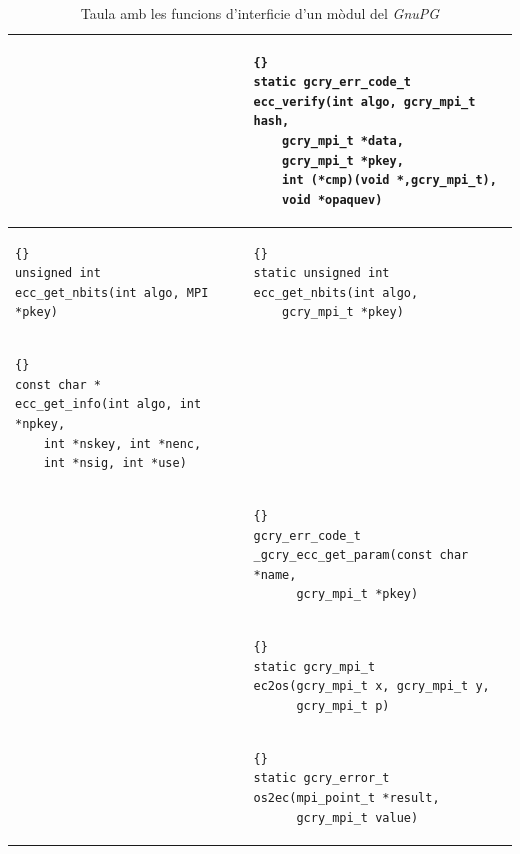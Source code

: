 \documentclass[12pt,twoside,catalan,a4paper]{book}%
\numberwithin{figure}{section}		%
\theoremstyle{definition}   			%
\theoremstyle{saltolinea}   			%
\begin{document}
\begin{table}
\begin{center}
\begin{tabular}{|l|l|}
&
{\tt \begin{lstlisting}{}
static gcry_err_code_t
ecc_verify(int algo, gcry_mpi_t hash,
    gcry_mpi_t *data,
    gcry_mpi_t *pkey,
    int (*cmp)(void *,gcry_mpi_t),
    void *opaquev)
\end{lstlisting} }
\\
\hline
{\tt \begin{lstlisting}{}
unsigned int
ecc_get_nbits(int algo, MPI *pkey)
\end{lstlisting} }
&
{\tt \begin{lstlisting}{}
static unsigned int
ecc_get_nbits(int algo,
    gcry_mpi_t *pkey)
\end{lstlisting} }
\\
\hline
{\tt \begin{lstlisting}{}
const char *
ecc_get_info(int algo, int *npkey,
    int *nskey, int *nenc,
    int *nsig, int *use)
\end{lstlisting} }
&\\
\hline
&
{\tt \begin{lstlisting}{}
gcry_err_code_t
_gcry_ecc_get_param(const char *name,
      gcry_mpi_t *pkey)
\end{lstlisting} }
\\
\hline
&
{\tt \begin{lstlisting}{}
static gcry_mpi_t
ec2os(gcry_mpi_t x, gcry_mpi_t y,
      gcry_mpi_t p)
\end{lstlisting} }
\\
\hline
&
{\tt \begin{lstlisting}{}
static gcry_error_t
os2ec(mpi_point_t *result,
      gcry_mpi_t value)
\end{lstlisting} }
\\
\hline

\end{tabular}
\end{center}
\caption{Taula amb les funcions d'interficie d'un m\`odul del \emph{GnuPG}\label{tab:interface}}
\end{table}
\end{document}
